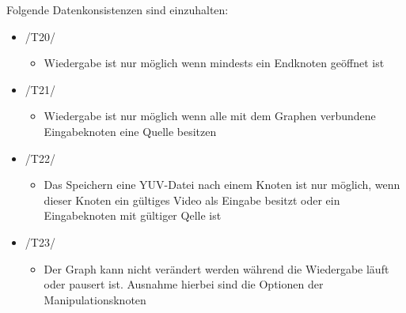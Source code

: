 \documentclass{article}
\begin{document}
\newpage
Folgende Datenkonsistenzen sind einzuhalten:
\begin{itemize}
	\item /T20/
		\begin{itemize}
			\item Wiedergabe ist nur möglich wenn mindests ein Endknoten geöffnet ist
		\end{itemize}
	\item /T21/
		\begin{itemize}
			\item Wiedergabe ist nur möglich wenn alle mit dem Graphen verbundene Eingabeknoten eine Quelle besitzen
		\end{itemize}
	\item /T22/
		\begin{itemize}
			\item Das Speichern eine YUV-Datei nach einem Knoten ist nur möglich, wenn dieser Knoten ein gültiges Video als Eingabe besitzt oder ein Eingabeknoten mit 
			gültiger Qelle ist
		\end{itemize}
	\item /T23/
		\begin{itemize}
			\item Der Graph kann nicht verändert werden während die Wiedergabe läuft oder pausert ist. Ausnahme hierbei sind die Optionen der Manipulationsknoten
		\end{itemize}
	\end{itemize}
\end{document}
